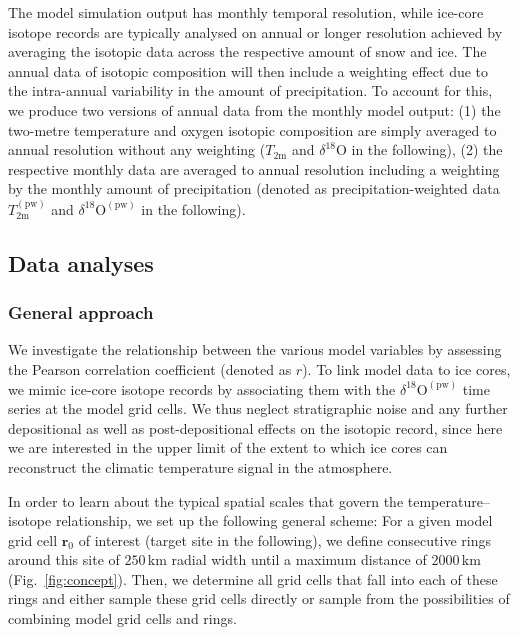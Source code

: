 \documentclass[cp, manuscript, draft]{copernicus}
\begin{document}
The model simulation output has monthly temporal resolution, while ice-core
isotope records are typically analysed on annual or longer resolution achieved
by averaging the isotopic data across the respective amount of snow and
ice. The annual data of isotopic composition will then include a weighting
effect due to the intra-annual variability in the amount of precipitation. To
account for this, we produce two versions of annual data from the monthly model
output: (1) the two-metre temperature and oxygen isotopic composition are simply
averaged to annual resolution without any weighting ($T_{2\mathrm{m}}$ and
$\delta^{18}\mathrm{O}$ in the following), (2) the respective monthly data are
averaged to annual resolution including a weighting by the monthly amount of
precipitation (denoted as precipitation-weighted data
$T_{2\mathrm{m}}^{\mathrm{(pw)}}$ and $\delta^{18}\mathrm{O}^{\mathrm{(pw)}}$ in
the following).

\subsection{Data analyses}\label{methods:main}

\subsubsection{General approach}\label{methods:general}

We investigate the relationship between the various model variables by assessing
the Pearson correlation coefficient (denoted as $r$). To link model data to ice
cores, we mimic ice-core isotope records by associating them with the
$\delta^{18}\mathrm{O}^{\mathrm{(pw)}}$ time series at the model grid cells. We
thus neglect stratigraphic noise and any further depositional as well as
post-depositional effects on the isotopic record, since here we are interested
in the upper limit of the extent to which ice cores can reconstruct the climatic
temperature signal in the atmosphere.

In order to learn about the typical spatial scales that govern the
temperature--isotope relationship, we set up the following general scheme: For a
given model grid cell $\mathbf{r}_0$ of interest (target site in the following),
we define consecutive rings around this site of $250$\,km radial width until a
maximum distance of $2000$\,km (Fig.~\ref{fig:concept}). Then, we determine all
grid cells that fall into each of these rings and either sample these grid cells
directly or sample from the possibilities of combining model grid cells and
rings.
\end{document}
